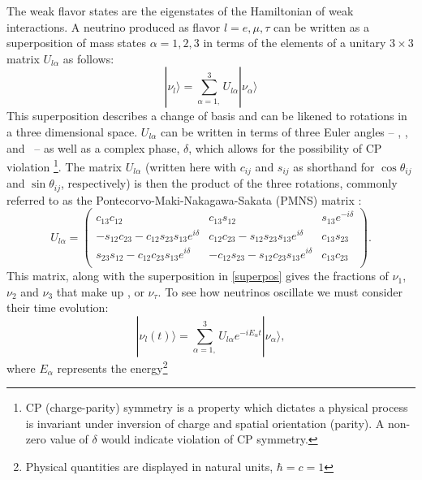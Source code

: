 The weak flavor states are the eigenstates of the Hamiltonian of
weak interactions.
A neutrino produced as flavor $l = e, \mu, \tau$ can be written as a
superposition of mass states $\alpha = 1, 2, 3$ in terms of the elements of a
unitary $3\times3$ matrix $U_{l\alpha}$ as follows:
\begin{equation}\label{superpos}
|\nu_l \rangle = \sum_{\alpha = 1,}^3 U_{l\alpha}|\nu_\alpha \rangle
\end{equation} %
This superposition describes a change of basis and can be likened to rotations
in a three dimensional space.
$U_{l\alpha}$ can be written in terms of three Euler angles --
\thetaot, \thetatth, and \thetaoth ~-- as well as a complex phase, $\delta$,
which allows for the possibility of CP violation
\footnote{CP (charge-parity) symmetry is a property which dictates a physical
process is invariant under inversion of charge and spatial orientation (parity).
A non-zero value of $\delta$ would indicate violation of CP symmetry\cite{ho2010elementary}.}.
The matrix $U_{l\alpha}$ (written here with $c_{ij}$ and $s_{ij}$ as shorthand
for
$\cos{\theta_{ij}}$ and $\sin{\theta_{ij}}$, respectively) is then the product
of the three rotations, commonly referred to as the
Pontecorvo-Maki-Nakagawa-Sakata (PMNS) matrix \cite{ho2010elementary}:
\begin{equation}
 U_{l\alpha} = \begin{pmatrix} \label{pmns}
c_{13}c_{12}              &    c_{13}s_{12}        &    s_{13} e^{-i\delta} \\
-s_{12}c_{23} - c_{12}s_{23}s_{13}e^{i\delta} & c_{12}c_{23} - s_{12}s_{23}s_{13}e^{i\delta}        &     c_{13}s_{23}  \\
s_{23}s_{12} - c_{12}c_{23}s_{13}e^{i\delta}  & -c_{12}s_{23} - s_{12}c_{23}s_{13}e^{i\delta}         &     c_{13}c_{23}  \\
\end{pmatrix}.
\end{equation}
This matrix, along with the superposition in \eqref{superpos} gives the
fractions of $\nu_1$, $\nu_2$ and $\nu_3$ that make up \nue, \numu or
$\nu_\tau$.
To see how neutrinos oscillate we must consider their time evolution:
\begin{equation}\label{evolve}
|\nu_l(t) \rangle = \sum_{\alpha = 1,}^3 U_{l\alpha}e^{-iE_\alpha t}|\nu_\alpha \rangle,
\end{equation}
where $E_\alpha$ represents the energy\footnote{Physical quantities are
displayed in natural units, $\hbar = c = 1$}
